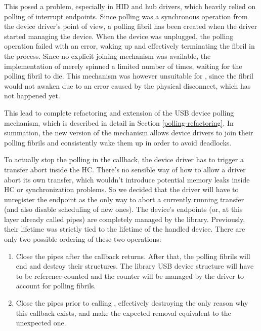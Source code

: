 This posed a problem, especially in HID and hub drivers, which heavily relied on
polling of interrupt endpoints. Since polling was a synchronous operation from
the device driver's point of view, a polling fibril has been created when the
driver started managing the device. When the device was unplugged, the polling
operation failed with an error, waking up and effectively terminating the fibril in
the process. Since no explicit joining mechanism was available, the
implementation of  merely spinned a limited number of times,
waiting for the polling fibril to die. This mechanism was however unsuitable for
, since the fibril would not awaken due to an error caused
by the physical disconnect, which has not happened yet.

This lead to complete refactoring and extension of the USB device polling
mechanism, which is described in detail in Section \ref{polling-refactoring}.
In summation, the new version of the mechanism allows device drivers to join
their polling fibrils and consistently wake them up in order to avoid deadlocks.

To actually stop the polling in the  callback, the device
driver has to trigger a transfer abort inside the HC. There's no sensible way
of how to allow a driver abort its own transfer, which wouldn't introduce
potential memory leaks inside HC or synchronization problems. So we decided
that the driver will have to unregister the endpoint as the only way to abort
a currently running transfer (and also disable scheduling of new ones). The
device's endpoints (or, at this layer already called pipes) are completely
managed by the  library. Previously, their lifetime was strictly
tied to the lifetime of the handled device. There are only two possible
ordering of these two operations:

\begin{enumerate}
	\item Close the pipes after the  callback returns.
		After that, the polling fibrils will end and destroy their structures.
		The library USB device structure will have to be reference-counted and
		the counter will be managed by the driver to account for polling
		fibrils.

	\item Close the pipes prior to calling , effectively
		destroying the only reason why this callback exists, and make the
		expected removal equivalent to the unexpected one.
\end{enumerate}

